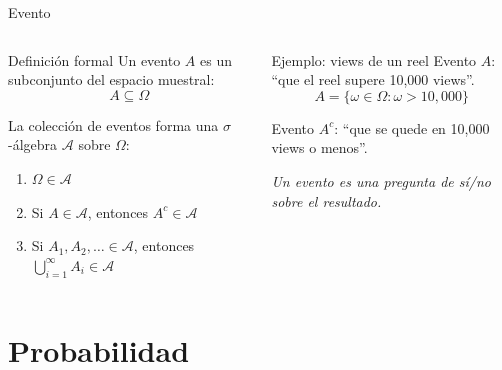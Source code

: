 \documentclass[aspectratio=169, 11pt]{beamer}
\begin{document}
\begin{frame}{Evento}
\begin{columns}[T]
\begin{block}{Definici\'on formal}
Un \alert{evento} $A$ es un subconjunto del espacio muestral:
\[
  A \subseteq \Omega
\]

\vspace{0.3em}
La colecci\'on de eventos forma una $\sigma$-\'algebra $\mathcal{A}$ sobre $\Omega$:
\begin{enumerate}
  \item $\Omega \in \mathcal{A}$
  \item Si $A \in \mathcal{A}$, entonces $A^c \in \mathcal{A}$
  \item Si $A_1, A_2, \dots \in \mathcal{A}$, entonces $\bigcup_{i=1}^{\infty} A_i \in \mathcal{A}$
\end{enumerate}
\end{block}

\begin{exampleblock}{Ejemplo: views de un reel}
Evento $A$: ``que el reel supere 10{,}000 views''.
\[
  A = \{\omega \in \Omega : \omega > 10{,}000\}
\]

\vspace{0.3em}
Evento $A^c$: ``que se quede en 10{,}000 views o menos''.

\vspace{0.3em}
\textit{Un evento es una pregunta de s\'i/no sobre el resultado.}
\end{exampleblock}
\end{columns}
\end{frame}

\section{Probabilidad}
\end{document}
